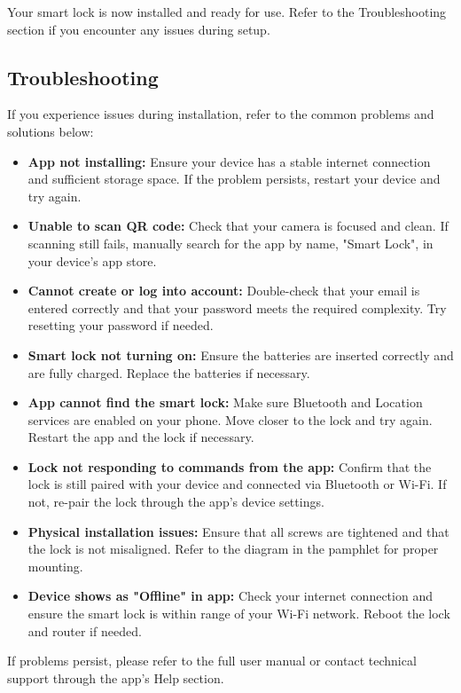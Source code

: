 Your smart lock is now installed and ready for use. Refer to the Troubleshooting section if you encounter any issues during setup.

\subsection{Troubleshooting}

If you experience issues during installation, refer to the common problems and solutions below:

\begin{itemize}
    \item \textbf{App not installing:}  
    Ensure your device has a stable internet connection and sufficient storage space. If the problem persists, restart your device and try again.

    \item \textbf{Unable to scan QR code:}  
    Check that your camera is focused and clean. If scanning still fails, manually search for the app by name, "Smart Lock", in your device’s app store.

    \item \textbf{Cannot create or log into account:}  
    Double-check that your email is entered correctly and that your password meets the required complexity. Try resetting your password if needed.

    \item \textbf{Smart lock not turning on:}  
    Ensure the batteries are inserted correctly and are fully charged. Replace the batteries if necessary.

    \item \textbf{App cannot find the smart lock:}  
    Make sure Bluetooth and Location services are enabled on your phone. Move closer to the lock and try again. Restart the app and the lock if necessary.

    \item \textbf{Lock not responding to commands from the app:}  
    Confirm that the lock is still paired with your device and connected via Bluetooth or Wi-Fi. If not, re-pair the lock through the app’s device settings.

    \item \textbf{Physical installation issues:}  
    Ensure that all screws are tightened and that the lock is not misaligned. Refer to the diagram in the pamphlet for proper mounting.

    \item \textbf{Device shows as "Offline" in app:}  
    Check your internet connection and ensure the smart lock is within range of your Wi-Fi network. Reboot the lock and router if needed.
\end{itemize}

If problems persist, please refer to the full user manual or contact technical support through the app’s Help section.
